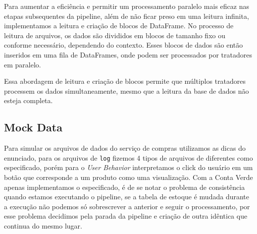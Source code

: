 \documentclass[12pt,a4paper]{article}
\begin{document}
Para aumentar a eficiência e permitir um processamento paralelo mais eficaz nas etapas subsequentes da pipeline, além de não ficar preso em uma leitura infinita, implementamos a leitura e criação de blocos de DataFrame. No processo de leitura de arquivos, os dados são divididos em blocos de tamanho fixo ou conforme necessário, dependendo do contexto. Esses blocos de dados são então inseridos em uma fila de DataFrames, onde podem ser processados por tratadores em paralelo.

Essa abordagem de leitura e criação de blocos permite que múltiplos tratadores processem os dados simultaneamente, mesmo que a leitura da base de dados não esteja completa.


\subsection*{Mock Data}
Para simular os arquivos de dados do serviço de compras utilizamos as dicas do enunciado, para os arquivos de \texttt{log} fizemos 4 tipos de arquivos de diferentes como especificado, porém para o \textit{User Behavior} interpretamos o click do usuário em um botão que corresponde a um produto como uma visualização. Com a Conta Verde apenas implementamos o especificado, é de se notar o problema de consistência quando estamos executando o pipeline, se a tabela de estoque é mudada durante a execução não podemos só sobrescrever a anterior e seguir o processamento, por esse problema decidimos pela parada da pipeline e criação de outra idêntica que continua do mesmo lugar.
\end{document}
